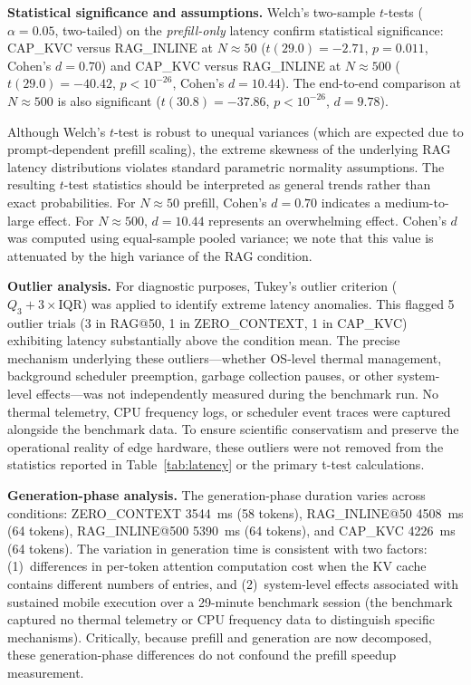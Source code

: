 \documentclass[journal]{IEEEtran}
\begin{document}
\textbf{Statistical significance and assumptions.} Welch's two-sample $t$-tests ($\alpha = 0.05$, two-tailed) on the \emph{prefill-only} latency confirm statistical significance: CAP\_KVC versus RAG\_INLINE at $N \approx 50$ ($t(29.0) = -2.71$, $p = 0.011$, Cohen's $d = 0.70$) and CAP\_KVC versus RAG\_INLINE at $N \approx 500$ ($t(29.0) = -40.42$, $p < 10^{-26}$, Cohen's $d = 10.44$). The end-to-end comparison at $N \approx 500$ is also significant ($t(30.8) = -37.86$, $p < 10^{-26}$, $d = 9.78$). 

Although Welch's $t$-test is robust to unequal variances (which are expected due to prompt-dependent prefill scaling), the extreme skewness of the underlying RAG latency distributions violates standard parametric normality assumptions. The resulting $t$-test statistics should be interpreted as general trends rather than exact probabilities. For $N \approx 50$ prefill, Cohen's $d = 0.70$ indicates a medium-to-large effect. For $N \approx 500$, $d = 10.44$ represents an overwhelming effect. Cohen's $d$ was computed using equal-sample pooled variance; we note that this value is attenuated by the high variance of the RAG condition.

\textbf{Outlier analysis.} For diagnostic purposes, Tukey's outlier criterion ($Q_3 + 3 \times \text{IQR}$) was applied to identify extreme latency anomalies. This flagged 5 outlier trials (3 in RAG@50, 1 in ZERO\_CONTEXT, 1 in CAP\_KVC) exhibiting latency substantially above the condition mean. The precise mechanism underlying these outliers---whether OS-level thermal management, background scheduler preemption, garbage collection pauses, or other system-level effects---was not independently measured during the benchmark run. No thermal telemetry, CPU frequency logs, or scheduler event traces were captured alongside the benchmark data. To ensure scientific conservatism and preserve the operational reality of edge hardware, these outliers were not removed from the statistics reported in Table~\ref{tab:latency} or the primary t-test calculations.

\textbf{Generation-phase analysis.} The generation-phase duration varies across conditions: ZERO\_CONTEXT 3544~ms (58 tokens), RAG\_INLINE@50 4508~ms (64 tokens), RAG\_INLINE@500 5390~ms (64 tokens), and CAP\_KVC 4226~ms (64 tokens). The variation in generation time is consistent with two factors: (1)~differences in per-token attention computation cost when the KV cache contains different numbers of entries, and (2)~system-level effects associated with sustained mobile execution over a 29-minute benchmark session (the benchmark captured no thermal telemetry or CPU frequency data to distinguish specific mechanisms). Critically, because prefill and generation are now decomposed, these generation-phase differences do not confound the prefill speedup measurement.
\end{document}
